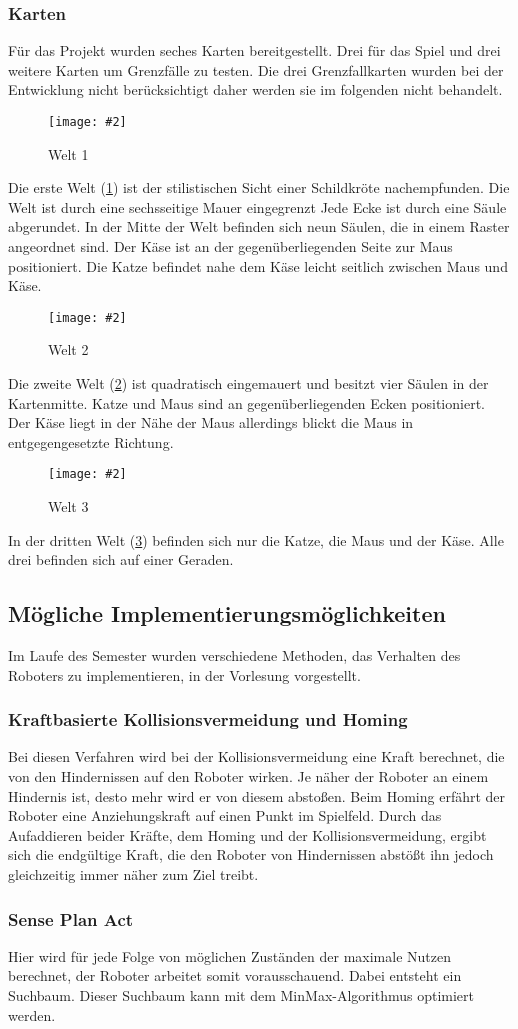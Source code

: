 \documentclass[
a4paper,     %
12pt         %
]{scrartcl}  %
\newcommand{\mygraphics}[3]{
\begin{figure}[!h]
  \begin{center}
    \texttt{[image: \#2]} \\
    \caption{#3}\label{fig:#2}
  \end{center}
\end{figure}

}
\begin{document}
\subsubsection{Karten}
Für das Projekt wurden seches Karten bereitgestellt. Drei für das Spiel und drei weitere Karten um Grenzfälle zu testen.  Die drei Grenzfallkarten wurden bei der Entwicklung nicht berücksichtigt daher werden sie im folgenden nicht behandelt.
\mygraphics{0.5\textwidth}{Welt1.png}{Welt 1}
Die erste Welt (\ref{fig:Welt1.png}) ist der stilistischen Sicht einer Schildkröte nachempfunden. Die Welt ist durch eine sechsseitige Mauer eingegrenzt Jede Ecke ist durch eine Säule abgerundet. In der Mitte der Welt befinden sich neun Säulen, die in einem Raster angeordnet sind. Der Käse ist an der gegenüberliegenden Seite zur Maus positioniert. Die Katze befindet nahe dem Käse leicht seitlich zwischen Maus und Käse.\\ \clearpage
\mygraphics{0.5\textwidth}{Welt2.png}{Welt 2}
Die zweite Welt (\ref{fig:Welt2.png}) ist quadratisch eingemauert und besitzt vier Säulen in der Kartenmitte. Katze und Maus sind an gegenüberliegenden Ecken positioniert. Der Käse liegt in der Nähe der Maus allerdings blickt die Maus in entgegengesetzte Richtung.\\
\mygraphics{0.5\textwidth}{Welt3.png}{Welt 3}
In der dritten Welt (\ref{fig:Welt3.png}) befinden sich nur die Katze, die Maus und der Käse.
Alle drei befinden sich auf einer Geraden.\clearpage
\subsection{Mögliche Implementierungsmöglichkeiten}
Im Laufe des Semester wurden verschiedene Methoden, das Verhalten des Roboters zu implementieren, in der Vorlesung vorgestellt.
\subsubsection{Kraftbasierte Kollisionsvermeidung und Homing}
Bei diesen Verfahren wird bei der Kollisionsvermeidung eine Kraft berechnet, die von den Hindernissen auf den Roboter wirken. Je näher der Roboter an einem Hindernis ist, desto mehr wird er von diesem  abstoßen. Beim Homing erfährt der Roboter eine Anziehungskraft auf einen Punkt im Spielfeld. Durch das Aufaddieren beider Kräfte, dem Homing und der Kollisionsvermeidung, ergibt sich die endgültige Kraft, die den Roboter von Hindernissen abstößt ihn jedoch gleichzeitig immer näher zum Ziel treibt.
\subsubsection{Sense Plan Act}
Hier wird für jede Folge von möglichen Zuständen der maximale Nutzen berechnet, der Roboter arbeitet somit vorausschauend. Dabei entsteht ein Suchbaum. Dieser Suchbaum kann mit dem MinMax-Algorithmus optimiert werden.
\end{document}
